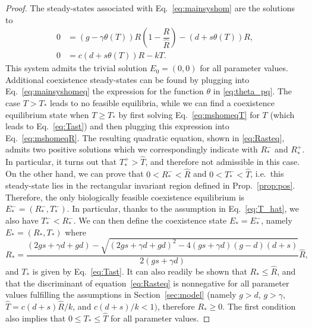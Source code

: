 \documentclass[11pt]{elsarticle}
\theoremstyle{plain}
\theoremstyle{definition}
\theoremstyle{myremark}
\begin{document}
\begin{proof}
The steady-states associated with Eq.~\eqref{eq:mainsyshom} are the solutions to
\begin{subequations} \label{eq:mainsyshomeq}
\begin{align}
0 &= 
\left(g-\gamma \theta(T)\right)R\left(1-\dfrac{R}{\hat{R}}\right)
-\left(d+s\theta(T)\right)R,\label{eq:mshomeqR} \\[0.3cm] 
0 &= c\left(d+s\theta(T)\right)R-kT.  \label{eq:mshomeqT}
\end{align}
\end{subequations}
This system admits the trivial solution $E_0=(0,0)$ for all parameter values. Additional coexistence steady-states can be found by plugging into Eq.~\eqref{eq:mainsyshomeq} the expression for the function $\theta$ in \eqref{eq:theta_pq}. The case $T>T_*$ leads to no feasible equilibria, while we can find a coexistence equilibrium state when $T\geq T_*$ by first solving Eq.~\eqref{eq:mshomeqT} for $T$ (which leads to Eq.~\eqref{eq:Tast}) and then plugging this expression into Eq.~\eqref{eq:mshomeqR}. The resulting quadratic equation, shown in \eqref{eq:Rasteq}, admits two positive solutions which we correspondingly indicate with $R_*^-$ and $R_*^+$. In particular, it turns out that $T_*^+>\hat{T}$, and therefore not admissible in this case. On the other hand, we can prove that $0<R_*^-<\hat{R}$ and $0<T_*^-<\hat{T}$, i.e.~this steady-state lies in the rectangular invariant region defined in Prop.~\ref{prop:pos}. Therefore, the only biologically feasible coexistence equilibrium is $E_*^-=(R_*^-, T_*^-)$. In particular, thanks to the assumption in Eq.~\eqref{eq:T_hat}, we also have $T_*^-<R_*^-$. We can then define the coexistence state $E_*=E_*^-$, namely $E_*=(R_*, T_*)$ where
$$R_*=\dfrac{( 2gs+\gamma d +gd )-\sqrt{( 2gs+\gamma d +gd)^2-4(gs+\gamma d)(g-d)(d+s)}}{2(gs+\gamma d)}\hat{R},$$
and $T_*$ is given by Eq.~\eqref{eq:Tast}. It can also readily be shown that $R_*\leq \hat{R}$, and that the discriminant of equation~\eqref{eq:Rasteq} is nonnegative for all parameter values fulfilling the assumptions in Section~\ref{sec:model} (namely $g>d$, $g>\gamma$, $\hat{T}=c(d+s)\hat{R}/k$, and $c(d+s)/k<1)$, therefore $R_*\geq 0$. The first condition also implies that $0\leq T_*\leq \hat{T}$ for all parameter values.
\end{proof}

\end{document}
